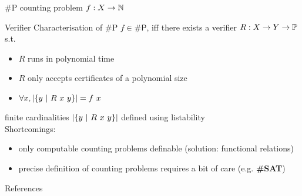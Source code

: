 \documentclass[11pt,usenames,dvipsnames,
hyperref={pdfencoding=auto,psdextra}]{beamer}
\begin{document}
\newcommand{\SharpP}{\textsf{\#P}}
\begin{frame}{\SharpP}
  counting problem $f : X \rightarrow \mathbb{N}$

  \begin{block}{Verifier Characterisation of \SharpP}
    $f \in \SharpP$, iff there exists a verifier $R : X \rightarrow Y \rightarrow \mathbb{P}$ s.t.\ 
    \begin{itemize}
      \item $R$ runs in polynomial time
      \item $R$ only accepts certificates of a polynomial size
      \item $\forall x, |\{y~|~R~x~y\}| = f~x$
    \end{itemize}
  \end{block}

  finite cardinalities $|\{y~|~R~x~y\}|$ defined using listability\\[2ex]

  Shortcomings: 
  \begin{itemize}
    \item only computable counting problems definable (solution: functional relations)
    \item precise definition of counting problems requires a bit of care (e.g. \textbf{\#SAT})
  \end{itemize}
\end{frame}


\begin{frame}[allowframebreaks]{References}
  \nocite{Sipser:TheoryofComputation}
  \nocite{Bläser:TISkript}
  
  {}
\end{frame}
\end{document}
